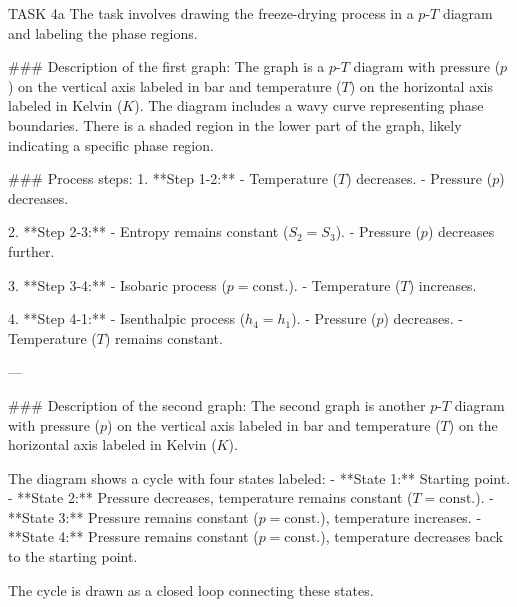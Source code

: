 TASK 4a  
The task involves drawing the freeze-drying process in a \( p \)-\( T \) diagram and labeling the phase regions.  

### Description of the first graph:  
The graph is a \( p \)-\( T \) diagram with pressure (\( p \)) on the vertical axis labeled in bar and temperature (\( T \)) on the horizontal axis labeled in Kelvin (\( K \)). The diagram includes a wavy curve representing phase boundaries. There is a shaded region in the lower part of the graph, likely indicating a specific phase region.  

### Process steps:  
1. **Step 1-2:**  
   - Temperature (\( T \)) decreases.  
   - Pressure (\( p \)) decreases.  

2. **Step 2-3:**  
   - Entropy remains constant (\( S_2 = S_3 \)).  
   - Pressure (\( p \)) decreases further.  

3. **Step 3-4:**  
   - Isobaric process (\( p = \text{const.} \)).  
   - Temperature (\( T \)) increases.  

4. **Step 4-1:**  
   - Isenthalpic process (\( h_4 = h_1 \)).  
   - Pressure (\( p \)) decreases.  
   - Temperature (\( T \)) remains constant.  

---

### Description of the second graph:  
The second graph is another \( p \)-\( T \) diagram with pressure (\( p \)) on the vertical axis labeled in bar and temperature (\( T \)) on the horizontal axis labeled in Kelvin (\( K \)).  

The diagram shows a cycle with four states labeled:  
- **State 1:** Starting point.  
- **State 2:** Pressure decreases, temperature remains constant (\( T = \text{const.} \)).  
- **State 3:** Pressure remains constant (\( p = \text{const.} \)), temperature increases.  
- **State 4:** Pressure remains constant (\( p = \text{const.} \)), temperature decreases back to the starting point.  

The cycle is drawn as a closed loop connecting these states.  

